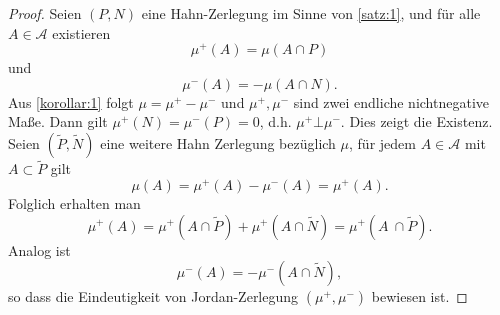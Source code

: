 \documentclass[/Users/zhangwusheng/Documents/satz von radon nikodym/satz von radon nikodym.tex]{subfiles}
\begin{document}
    \begin{proof}
        Seien $(P, N)$ eine Hahn-Zerlegung im Sinne von \cref{satz:1}, und für alle $A \in \mathcal{A}$ existieren 
        \[\mu^{+}(A) = \mu(A \cap P)\]
        und 
        \[\mu^{-}(A) = -\mu(A \cap N).\]
        Aus \cref{korollar:1} folgt $\mu = \mu^{+} - \mu^{-}$ und $\mu^{+}, \mu^{-}$ sind zwei endliche nichtnegative Maße. Dann gilt $\mu^{+}(N) = \mu^{-}(P) = 0$, d.h. $\mu^{+} \bot \mu^{-}$. 
        Dies zeigt die Existenz.\\
        Seien $(\tilde{P}, \tilde{N})$ eine weitere Hahn Zerlegung bezüglich $\mu$, für jedem $A \in \mathcal{A}$ mit $A \subset \tilde{P}$ gilt 
        \[\mu(A) = \mu^{+}(A) - \mu^{-}(A) = \mu^{+}(A).\]
        Folglich erhalten man 
        \[\mu^{+}(A) = \mu^{+}(A \cap \tilde{P})  + \mu^{+}(A \cap \tilde{N}) = \mu^{+}(A\ \cap \tilde{P}).\]
        Analog ist 
        \[\mu^{-}(A) = -\mu^{-}(A \cap \tilde{N}),\]
        so dass die Eindeutigkeit von Jordan-Zerlegung $(\mu^{+}, \mu^{-})$ bewiesen ist. 
    \end{proof}
\end{document}

